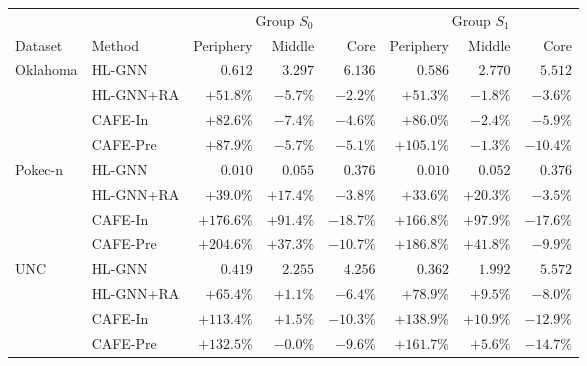 \begin{tabular}{llrrrrrr}
\toprule
 & & \multicolumn{3}{c}{Group $S_0$} & \multicolumn{3}{c}{Group $S_1$} \\
\cmidrule(lr){3-5}\cmidrule(lr){6-8}
Dataset & Method & Periphery & Middle & Core & Periphery & Middle & Core \\
\midrule
Oklahoma & HL-GNN & $0.612$ & $3.297$ & $6.136$ & $0.586$ & $2.770$ & $5.512$ \\
 & HL-GNN+RA & $+51.8\%$ & $-5.7\%$ & $-2.2\%$ & $+51.3\%$ & $-1.8\%$ & $-3.6\%$ \\
 & CAFE-In & $+82.6\%$ & $-7.4\%$ & $-4.6\%$ & $+86.0\%$ & $-2.4\%$ & $-5.9\%$ \\
 & CAFE-Pre & $+87.9\%$ & $-5.7\%$ & $-5.1\%$ & $+105.1\%$ & $-1.3\%$ & $-10.4\%$ \\
\addlinespace[2pt]
Pokec-n & HL-GNN & $0.010$ & $0.055$ & $0.376$ & $0.010$ & $0.052$ & $0.376$ \\
 & HL-GNN+RA & $+39.0\%$ & $+17.4\%$ & $-3.8\%$ & $+33.6\%$ & $+20.3\%$ & $-3.5\%$ \\
 & CAFE-In & $+176.6\%$ & $+91.4\%$ & $-18.7\%$ & $+166.8\%$ & $+97.9\%$ & $-17.6\%$ \\
 & CAFE-Pre & $+204.6\%$ & $+37.3\%$ & $-10.7\%$ & $+186.8\%$ & $+41.8\%$ & $-9.9\%$ \\
\addlinespace[2pt]
UNC & HL-GNN & $0.419$ & $2.255$ & $4.256$ & $0.362$ & $1.992$ & $5.572$ \\
 & HL-GNN+RA & $+65.4\%$ & $+1.1\%$ & $-6.4\%$ & $+78.9\%$ & $+9.5\%$ & $-8.0\%$ \\
 & CAFE-In & $+113.4\%$ & $+1.5\%$ & $-10.3\%$ & $+138.9\%$ & $+10.9\%$ & $-12.9\%$ \\
 & CAFE-Pre & $+132.5\%$ & $-0.0\%$ & $-9.6\%$ & $+161.7\%$ & $+5.6\%$ & $-14.7\%$ \\
\bottomrule
\end{tabular}
